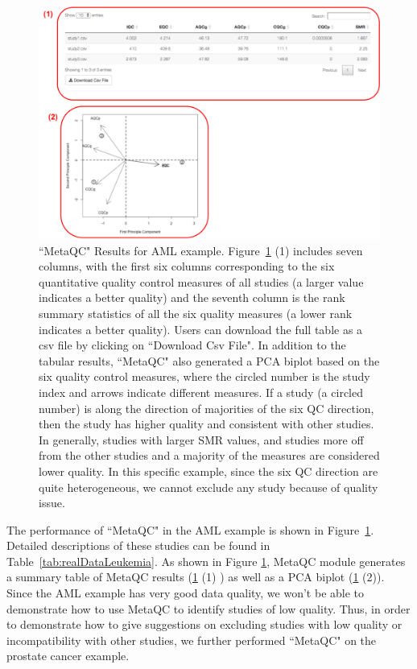 \begin{figure}[H]
\begin{center}
\includegraphics[scale=0.65]{./figure/metaQC/metaQCresult_AML.pdf}
\caption{``MetaQC" Results for AML example.
Figure~\ref{fig:MetaQCresult_AML} {\color{red} (1)} includes seven columns, 
with the first six columns corresponding to the six quantitative quality control measures of all studies (a larger value indicates a better quality) and the seventh column is the rank summary statistics of all the six quality measures (a lower rank indicates a better quality). 
Users can download the full table as a csv file by clicking on ``Download Csv File". 
In addition to the tabular results, ``MetaQC" also generated a PCA biplot based on the six quality control measures, 
where the circled number is the study index and arrows indicate different measures. 
If a study (a circled number) is along the direction of majorities of the six QC direction, then the study has higher quality and consistent with other studies.
In generally, studies with larger SMR values, and studies more off from the other studies and a majority of the measures are considered lower quality.
In this specific example, since the six QC direction are quite heterogeneous, 
we cannot exclude any study because of quality issue.
}
\label{fig:MetaQCresult_AML}
\end{center}
\end{figure}


The performance of ``MetaQC" in the AML example is shown in Figure~\ref{fig:MetaQCresult_AML}.
Detailed descriptions of these studies can be found in Table~\ref{tab:realDataLeukemia}. 
As shown in Figure \ref{fig:MetaQCresult_AML}, 
MetaQC module generates a summary table of MetaQC results (\ref{fig:MetaQCresult_AML} {\color{red} (1)} ) 
as well as a PCA biplot (\ref{fig:MetaQCresult_AML} {\color{red} (2)}). 
Since the AML example has very good data quality,
we won't be able to demonstrate how to use MetaQC to identify studies of low quality.
Thus, in order to demonstrate how to give suggestions on excluding studies with low quality or incompatibility with other studies,
we further performed ``MetaQC" on the prostate cancer example.


